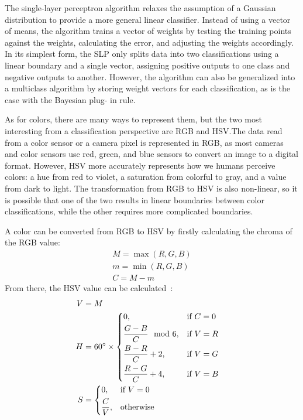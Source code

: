 \documentclass[twoside]{IEEEtran}
\begin{document}
The single-layer perceptron algorithm relaxes the assumption of a Gaussian distribution to
provide a more general linear classifier. Instead of using a vector of means, the algorithm trains a
vector of weights by testing the training points against the weights, calculating the error, and
adjusting the weights accordingly. In its simplest form, the SLP only splits data into two
classifications using a linear boundary and a single vector, assigning positive outputs to one class
and negative outputs to another. However, the algorithm can also be generalized into a multiclass
algorithm by storing weight vectors for each classification, as is the case with the Bayesian plug-
in rule.

As for colors, there are many ways to represent them, but the two most interesting from a
classification perspective are RGB and HSV.\@ The data read from a color sensor or a camera pixel
is represented in RGB, as most cameras and color sensors use red, green, and blue sensors to
convert an image to a digital format. However, HSV more accurately represents how we humans
perceive colors: a hue from red to violet, a saturation from colorful to gray, and a value from
dark to light. The transformation from RGB to HSV is also non-linear, so it is possible that one
of the two results in linear boundaries between color classifications, while the other requires
more complicated boundaries.

A color can be converted from RGB to HSV by firstly calculating the chroma of the RGB value:
\begin{align*}
     & M = \max\left(R, G, B\right) & \\
     & m = \min\left(R, G, B\right) & \\
     & C = M - m                    &
\end{align*}
From there, the HSV value can be calculated~\cite{hsv}:
\begin{align*}
    V & = M                                           &              \\
    H & = 60^\circ \times \begin{dcases}
                              0,                      & \text{if } C = 0 \\
                              \frac{G - B}{C} \mod 6, & \text{if } V = R \\
                              \frac{B - R}{C} + 2,    & \text{if } V = G \\
                              \frac{R - G}{C} + 4,    & \text{if } V = B
                          \end{dcases} & \\
    S & = \begin{dcases}
              0,           & \text{if } V = 0 \\
              \frac{C}{V}, & \text{otherwise}
          \end{dcases}
\end{align*}
\end{document}
